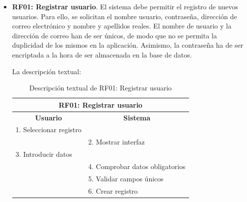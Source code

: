 \begin{itemize}
	\item \textbf{RF01: Registrar usuario}. El sistema debe permitir el registro de nuevos usuarios. Para ello, se solicitan el nombre usuario, contraseña, dirección de correo electrónico y nombre y apellidos reales. El nombre de usuario y la dirección de correo han de ser únicos, de modo que no se permita la duplicidad de los mismos en la aplicación. Asimismo, la contraseña ha de ser encriptada a la hora de ser almacenada en la base de datos.
	
	La descripción textual:
	\begin{table}[h]
		\centering	
		\begin{tabular}{|l|l|}
			\hline
			\multicolumn{2}{|c|}{\textbf{RF01: Registrar usuario}} \\ \hline
			\multicolumn{1}{|c|}{\textbf{Usuario}} & \multicolumn{1}{c|}{\textbf{Sistema}} \\ \hline
			1. Seleccionar registro &\\ \hline
			& 2. Mostrar interfaz \\ \hline
			3. Introducir datos &\\ \hline
			& 4. Comprobar datos obligatorios \\ \hline
			& 5. Validar campos únicos\\ \hline
			& 6. Crear registro \\ \hline
		\end{tabular}
		\caption{Descripción textual de RF01: Registrar usuario}
		\label{tab:tablaDescTextualRF01}
	\end{table}
	

\end{itemize}
